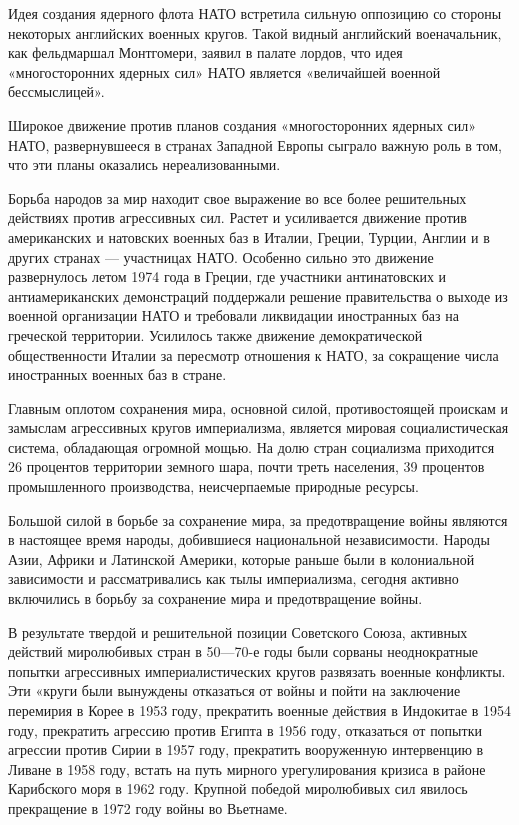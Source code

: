 \documentclass[12pt, a4paper, openany]{book}
\begin{document}
	Идея создания ядерного флота НАТО встретила сильную оппозицию со стороны некоторых английских военных кругов. Такой видный английский военачальник, как фельдмаршал Монтгомери, заявил в палате лордов, что идея «многосторонних ядерных сил» НАТО является «величайшей военной бессмыслицей».
	
	Широкое движение против планов создания «многосторонних ядерных сил» НАТО, развернувшееся в странах Западной Европы сыграло важную роль в том, что эти планы оказались нереализованными.
	
	Борьба народов за мир находит свое выражение во все более решительных действиях против агрессивных сил. Растет и усиливается движение против американских и натовских военных баз в Италии, Греции, Турции, Англии и в других странах — участницах НАТО. Особенно сильно это движение развернулось летом 1974 года в Греции, где участники антинатовских и антиамериканских демонстраций поддержали решение правительства о выходе из военной организации НАТО и требовали ликвидации иностранных баз на греческой территории. Усилилось также движение демократической общественности Италии за пересмотр отношения к НАТО, за сокращение числа иностранных военных баз в стране.
	
	Главным оплотом сохранения мира, основной силой, противостоящей проискам и замыслам агрессивных кругов империализма, является мировая социалистическая система, обладающая огромной мощью. На долю стран социализма приходится 26 процентов территории земного шара, почти треть населения, 39 процентов промышленного производства, неисчерпаемые природные ресурсы.
	
	Большой силой в борьбе за сохранение мира, за предотвращение войны являются в настоящее время народы, добившиеся национальной независимости. Народы Азии, Африки и Латинской Америки, которые раньше были в колониальной зависимости и рассматривались как тылы империализма, сегодня активно включились в борьбу за сохранение мира и предотвращение войны.
	
	В результате твердой и решительной позиции Советского Союза, активных действий миролюбивых стран в 50—70-е годы были сорваны неоднократные попытки агрессивных империалистических кругов развязать военные конфликты. Эти «круги были вынуждены отказаться от войны и пойти на заключение перемирия в Корее в 1953 году, прекратить военные действия в Индокитае в 1954 году, прекратить агрессию против Египта в 1956 году, отказаться от попытки агрессии против Сирии в 1957 году, прекратить вооруженную интервенцию в Ливане в 1958 году, встать на путь мирного урегулирования кризиса в районе Карибского моря в 1962 году. Крупной победой миролюбивых сил явилось прекращение в 1972 году войны во Вьетнаме.
	
\end{document}

